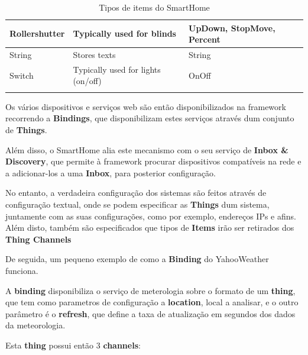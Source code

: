 \begin{table}[H]
{\begin{tabular}{lll}
\multicolumn{1}{|l|}{Rollershutter} & \multicolumn{1}{l|}{Typically used for blinds}                         & \multicolumn{1}{l|}{UpDown, StopMove, Percent}                    \\ \hline
\multicolumn{1}{|l|}{String}        & \multicolumn{1}{l|}{Stores texts}                                      & \multicolumn{1}{l|}{String}                                       \\ \hline
\multicolumn{1}{|l|}{Switch}        & \multicolumn{1}{l|}{Typically used for lights (on/off)}                & \multicolumn{1}{l|}{OnOff}                                        \\ \hline
                                    &                                                                        &                                                                  
\end{tabular}}
\caption{Tipos de items do SmartHome}
\label{smarthometypes}
\end{table}

Os vários dispositivos e serviços web são então disponibilizados na framework recorrendo a \textbf{Bindings}, que disponibilizam estes serviços através dum conjunto de \textbf{Things}.

Além disso, o SmartHome alia este mecanismo com o seu serviço de \textbf{Inbox \& Discovery}, que permite à framework procurar dispositivos compatíveis na rede e a adicionar-los a uma \textbf{Inbox}, para posterior configuração.

No entanto, a verdadeira configuração dos sistemas são feitos através de configuração textual, onde se podem especificar as \textbf{Things} dum sistema, juntamente com as suas configurações, como por exemplo, endereços IPs e afins. Além disto, também são especificados que tipos de \textbf{Items} irão ser retirados dos \textbf{Thing Channels}

De seguida, um pequeno exemplo de como a \textbf{Binding} do YahooWeather funciona.

A \textbf{binding} disponibiliza o serviço de meterologia sobre o formato de um \textbf{thing}, que tem como parametros de configuração a \textbf{location}, local a analisar, e o outro parâmetro é o \textbf{refresh}, que define a taxa de atualização em segundos dos dados da meteorologia. 

Esta \textbf{thing} possui então 3 \textbf{channels}:


